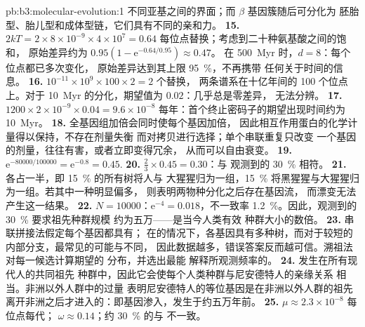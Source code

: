 \begin{solution}{pb:b3:molecular-evolution:1}
不同亚基之间的界面；而 $\beta$ 基因簇随后可分化为
胚胎型、胎儿型和成体型链，它们具有不同的亲和力。
\textbf{15.} $2kT = 2\times 8\times 10^{-9}\times 4\times 10^{7} = 0.64$
每位点替换；考虑到二十种氨基酸之间的饱和，
原始差异约为 $0.95(1 - \mathrm{e}^{-0.64/0.95}) \approx 0.47$。
在 \qty{500}{Myr} 时，$d = 8$：每个位点都已多次变化，
原始差异达到其上限 \qty{95}{\%}，不再携带
任何关于时间的信息。
\textbf{16.} $10^{-11}\times 10^{9}\times 100\times 2 = 2$ 个替换，
两条谱系在十亿年间的 100 个位点上。对于
\qty{10}{Myr} 的分化，期望值为 $0.02$：几乎总是零差异，
无法分辨。
\textbf{17.} $1200\times 2\times 10^{-9}\times 0.04 = 9.6\times 10^{-8}$
每年：首个终止密码子的期望出现时间约为 \qty{10}{Myr}。
\textbf{18.} 全基因组加倍会同时使每个基因加倍，
因此相互作用蛋白的化学计量得以保持，不存在剂量失衡
而对拷贝进行选择；单个串联重复只改变
一个基因的剂量，往往有害，或者立即变得冗余，
从而可以自由衰变。
\textbf{19.} $\mathrm{e}^{-\num{80000}/\num{100000}} = \mathrm{e}^{-0.8} = 0.45$.
\textbf{20.} $\tfrac{2}{3}\times 0.45 = 0.30$：与
观测到的 \qty{30}{\%} 相符。
\textbf{21.} 各占一半，即 \qty{15}{\%} 的所有树将人与
大猩猩归为一组，\qty{15}{\%} 将黑猩猩与大猩猩归为一组。若其中一种明显偏多，
则表明两物种分化之后存在基因流，
而漂变无法产生这一结果。
\textbf{22.} $N = \num{10000}$：$\mathrm{e}^{-4} = 0.018$，不一致率
\qty{1.2}{\%}。因此，观测到的 \qty{30}{\%} 要求祖先种群规模
约为五万——是当今人类有效
种群大小的数倍。
\textbf{23.} 串联拼接法假定每个基因都具有；
在的情况下，各基因具有多种树，而对于较短的
内部分支，最常见的可能与不同，
因此数据越多，错误答案反而越可信。溯祖法
对每一候选计算期望的
分布，并选出最能
解释所观测频率的。
\textbf{24.} 发生在所有现代人的共同祖先
种群中，因此它会使每个人类种群与尼安德特人的亲缘关系
相当。非洲以外人群中的过量
表明尼安德特人的等位基因是在非洲以外人群的祖先
离开非洲之后才进入的：即基因渗入，发生于约五万年前。
\textbf{25.} $\mu \approx 2.3\times 10^{-8}$ 每位点每代；
$\omega \approx 0.14$；约 \qty{30}{\%} 的与
不一致。
\end{solution}
